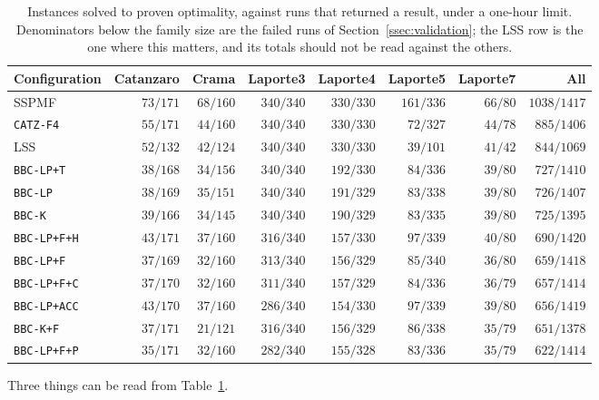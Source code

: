 \begin{table}[t]\centering
\scriptsize
\setlength{\tabcolsep}{4pt}
\begin{tabular}{@{}lrrrrrrr@{}}
\toprule
Configuration & Catanzaro & Crama & Laporte3 & Laporte4 & Laporte5 & Laporte7 & All\\
\midrule
SSPMF              & $73/171$ & $68/160$ & $340/340$ & $330/330$ & $161/336$ & $66/80$ & $1038/1417$\\
\texttt{CATZ-F4}   & $55/171$ & $44/160$ & $340/340$ & $330/330$ & $72/327$  & $44/78$ & $885/1406$\\
LSS                & $52/132$ & $42/124$ & $340/340$ & $330/330$ & $39/101$  & $41/42$ & $844/1069$\\
\midrule
\texttt{BBC-LP+T}  & $38/168$ & $34/156$ & $340/340$ & $192/330$ & $84/336$  & $39/80$ & $727/1410$\\
\texttt{BBC-LP}    & $38/169$ & $35/151$ & $340/340$ & $191/329$ & $83/338$  & $39/80$ & $726/1407$\\
\texttt{BBC-K}     & $39/166$ & $34/145$ & $340/340$ & $190/329$ & $83/335$  & $39/80$ & $725/1395$\\
\texttt{BBC-LP+F+H}& $43/171$ & $37/160$ & $316/340$ & $157/330$ & $97/339$  & $40/80$ & $690/1420$\\
\texttt{BBC-LP+F}  & $37/169$ & $32/160$ & $313/340$ & $156/329$ & $85/340$  & $36/80$ & $659/1418$\\
\texttt{BBC-LP+F+C}& $37/170$ & $32/160$ & $311/340$ & $157/329$ & $84/336$  & $36/79$ & $657/1414$\\
\texttt{BBC-LP+ACC}& $43/170$ & $37/160$ & $286/340$ & $154/330$ & $97/339$  & $39/80$ & $656/1419$\\
\texttt{BBC-K+F}   & $37/171$ & $21/121$ & $316/340$ & $156/329$ & $86/338$  & $35/79$ & $651/1378$\\
\texttt{BBC-LP+F+P}& $35/171$ & $32/160$ & $282/340$ & $155/328$ & $83/336$  & $35/79$ & $622/1414$\\
\bottomrule
\end{tabular}
\caption{Instances solved to proven optimality, against runs that returned a result,
under a one-hour limit. Denominators below the family size are the failed runs of
Section~\ref{ssec:validation}; the LSS row is the one where this matters, and its
totals should not be read against the others.}
\label{tab:solves}
\end{table}

Three things can be read from Table~\ref{tab:solves}.

